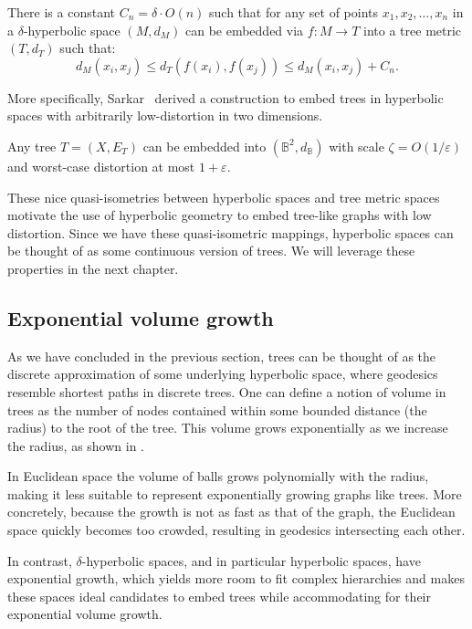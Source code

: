 \begin{proposition}
    There is a constant $C_n =\delta \cdot O(n)$ such that for any set of points $x_1, x_2, \dots,x_n$ in a $\delta$-hyperbolic space $(M,d_M)$ can be embedded via $f:M \to T$ into a tree metric $(T,d_T)$ such that:
    \begin{equation*}
        d_M(x_i, x_j)\leq d_T(f(x_i), f(x_j)) \leq d_M(x_i, x_j) + C_n.
    \end{equation*}
\end{proposition}

More specifically, Sarkar~\cite{sarkar2011lowDIstortionDelaunayEmbedding} derived a construction to embed trees in hyperbolic spaces with arbitrarily low-distortion in two dimensions.

\begin{proposition}[Sarkar]
    Any tree $T=(X,E_T)$ can be embedded into $(\mathbb{B}^2, d_\mathbb{B})$ with scale $\zeta = O(1/\varepsilon)$ and worst-case distortion at most $1 + \varepsilon$.
\end{proposition}

These nice quasi-isometries between hyperbolic spaces and tree metric spaces motivate the use of hyperbolic geometry to embed tree-like graphs with low distortion. Since we have these quasi-isometric mappings, hyperbolic spaces can be thought of as some continuous version of trees. We will leverage these properties in the next chapter. 

\subsection{Exponential volume growth}\label{sec:expGrowth}
As we have concluded in the previous section, trees can be thought of as the discrete approximation of some underlying hyperbolic space, where geodesics resemble shortest paths in discrete trees. One can define a notion of volume in trees as the number of nodes contained within some bounded distance (the radius) to the root of the tree. This volume grows exponentially as we increase the radius, as shown in .



In Euclidean space the volume of balls grows polynomially with the radius, making it less suitable to represent exponentially growing graphs like trees. More concretely, because the growth is not as fast as that of the graph, the Euclidean space quickly becomes too crowded, resulting in geodesics intersecting each other.

In contrast, $\delta$-hyperbolic spaces, and in particular hyperbolic spaces, have exponential growth, which yields more room to fit complex hierarchies and makes these spaces ideal candidates to embed trees while accommodating for their exponential volume growth. 





